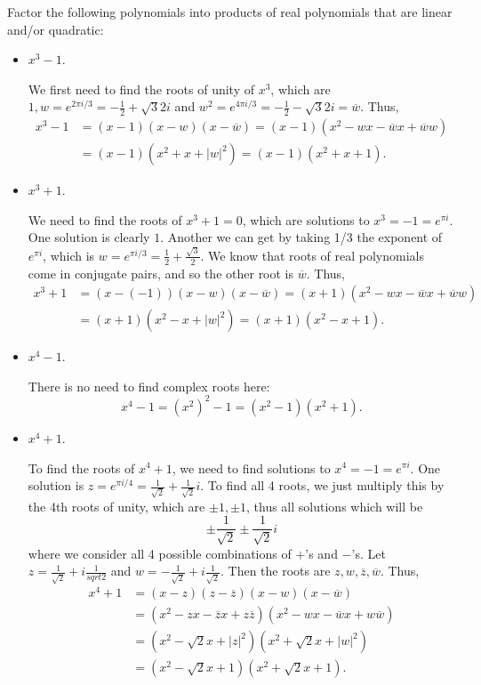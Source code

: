 \documentclass[11pt,dvipsnames]{book}
\numberwithin{equation}{section} %
\numberwithin{figure}{section} %
\numberwithin{table}{section} %
\begin{document}
\begin{exercise} Factor the following polynomials into products of real polynomials that are linear and/or quadratic:

\begin{itemize}
\item $x^3-1$.
\begin{solution}
We first need to find the roots of unity of $x^3$, which are $1, w=e^{2\pi i/3}=-\frac{1}{2}+\sqrt{3}{2}i$ and $w^2=e^{4\pi i/3} = -\frac{1}{2}-\sqrt{3}{2}i=\overline{w}$.  Thus,
\begin{align*}
x^3-1 & = (x-1)(x-w)(x-\overline{w}) = (x-1)(x^2-wx-\overline{w}x+\overline{w}w) \\
& = (x-1)(x^2+x+|w|^2) = (x-1)(x^2+x+1).
\end{align*}
\end{solution}
\item $x^3+1$.

\begin{solution}
We need to find the roots of $x^3+1=0$, which are solutions to $x^3=-1=e^{\pi i}$. One solution is clearly $1$. Another we can get by taking 1/3 the exponent of $e^{\pi i}$, which is $w=e^{\pi i/3} = \frac{1}{2}+\frac{\sqrt{3}}{2}$. We know that roots of real polynomials come in conjugate pairs, and so the other root is $\overline{w}$. Thus,
\begin{align*}
x^3+1 & = (x-(-1))(x-w)(x-\overline{w}) = (x+1)(x^2-wx-\overline{w}x+\overline{w}w) \\
& = (x+1)(x^2-x+|w|^2) = (x+1)(x^2-x+1).
\end{align*}
\end{solution}

\item $x^4-1$.

\begin{solution}
There is no need to find complex roots here:
\[
x^4-1 = (x^2)^2-1 = (x^2-1)(x^2+1).
\]
\end{solution}

\item $x^4+1$. 

\begin{solution}
To find the roots of $x^4+1$, we need to find solutions to $x^4=-1=e^{\pi i}$. One solution is $z=e^{\pi i/4}=\frac{1}{\sqrt{2}}+\frac{1}{\sqrt{2}}i$. To find all 4 roots, we just multiply this by the 4th roots of unity, which are $\pm 1, \pm 1$, thus all solutions which will be
\[
\pm \frac{1}{\sqrt{2}} \pm \frac{1}{\sqrt{2}}i
\]
where we consider all 4 possible combinations of $+$'s and $-$'s. Let $z=\frac{1}{\sqrt{2}}+i\frac{1}{sqrt{2}}$ and $w=-\frac{1}{\sqrt{2}}+i\frac{1}{\sqrt{2}}$. Then the roots are $z,w,\overline{z},\overline{w}$. Thus,
\begin{align*}
x^4+1 & 
= (x-z)(z-\overline{z})(x-w)(x-\overline{w})\\
& =(x^2 -zx-\overline{z}x+z\overline{z})(x^2 -wx-\overline{w}x+w\overline{w})\\
& = (x^2-\sqrt{2}x+|z|^2)(x^2+\sqrt{2}x+|w|^2)\\
& = (x^2-\sqrt{2}x+1)(x^2+\sqrt{2}x+1).
\end{align*}
\end{solution}


\end{itemize}
\end{exercise}
\end{document}

